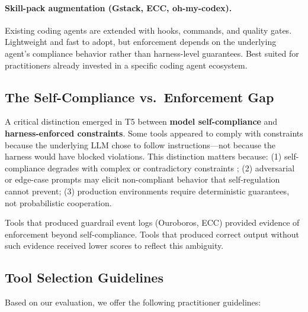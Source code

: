 \documentclass[11pt,a4paper]{article}
\begin{document}
\paragraph{Skill-pack augmentation (Gstack, ECC, oh-my-codex).}
Existing coding agents are extended with hooks, commands, and quality gates.
Lightweight and fast to adopt, but enforcement depends on the underlying agent's compliance behavior rather than harness-level guarantees.
Best suited for practitioners already invested in a specific coding agent ecosystem.

\subsection{The Self-Compliance vs.\ Enforcement Gap}

A critical distinction emerged in T5 between \textbf{model self-compliance} and \textbf{harness-enforced constraints}.
Some tools appeared to comply with constraints because the underlying LLM chose to follow instructions---not because the harness would have blocked violations.
This distinction matters because:
(1) self-compliance degrades with complex or contradictory constraints \cite{guardrailsmd2026};
(2) adversarial or edge-case prompts may elicit non-compliant behavior that self-regulation cannot prevent;
(3) production environments require deterministic guarantees, not probabilistic cooperation.

Tools that produced guardrail event logs (Ouroboros, ECC) provided evidence of enforcement beyond self-compliance.
Tools that produced correct output without such evidence received lower scores to reflect this ambiguity.

\subsection{Tool Selection Guidelines}

Based on our evaluation, we offer the following practitioner guidelines:
\end{document}
